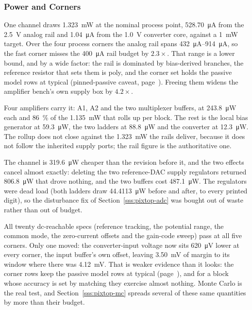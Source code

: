 \subsubsection{Power and Corners}\label{sss:pixtop-power}

One channel draws \SI{1.323}{\milli\watt} at the nominal process point,
\SI{528.70}{\micro\ampere} from the \SI{2.5}{\volt} analog rail and
\SI{1.04}{\micro\ampere} from the \SI{1.0}{\volt} converter core, against a
\SI{1}{\milli\watt} target. Over the four process corners the analog rail spans
\SIrange{432}{914}{\micro\ampere}, so the fast corner misses the
\SI{400}{\micro\ampere} rail budget by \(2.3\times\). That range is a lower
bound, and by a wide factor: the rail is dominated by bias-derived branches, the
reference resistor that sets them is poly, and the corner set holds the passive
model rows at typical (pinned-passive caveat,
page~\pageref{p:pinned-passives}). Freeing them widens the amplifier bench's own
supply box by \(4.2\times\).

Four amplifiers carry it: A1, A2 and the two multiplexer buffers, at
\SI{243.8}{\micro\watt} each and \SI{86}{\percent} of the
\SI{1.135}{\milli\watt} that rolls up per block. The rest is the local bias
generator at \SI{59.3}{\micro\watt}, the two ladders at
\SI{88.8}{\micro\watt} and the converter at \SI{12.3}{\micro\watt}. The rollup
does not close against the \SI{1.323}{\milli\watt} the rails deliver, because it
does not follow the inherited supply ports; the rail figure is the authoritative
one.

The channel is \SI{319.6}{\micro\watt} cheaper than the revision before it, and
the two effects cancel almost exactly: deleting the two reference-DAC supply
regulators returned \SI{806.8}{\micro\watt} that drove nothing, and the two
buffers cost \SI{487.1}{\micro\watt}. The regulators were dead load (both
ladders draw \SI{44.4113}{\micro\watt} before and after, to every printed digit),
so the disturbance fix of Section~\ref{sss:pixtop-adc} was bought out of
waste rather than out of budget.

All twenty dc-reachable specs (reference tracking, the potential range, the
common mode, the zero-current offsets and the gain-code sweep) pass at all
five corners. Only one moved: the converter-input voltage now sits
\SI{620}{\micro\volt} lower at every corner, the input buffer's own offset,
leaving \SI{3.50}{\milli\volt} of margin to its window where there was
\SI{4.12}{\milli\volt}. That is weaker evidence than it looks: the corner rows
keep the passive model rows at typical (page~\pageref{p:pinned-passives}), and
for a block whose accuracy is set by matching they exercise almost nothing.
Monte Carlo is the real test, and
Section~\ref{sss:pixtop-mc} spreads several of these same quantities by more
than their budget.
